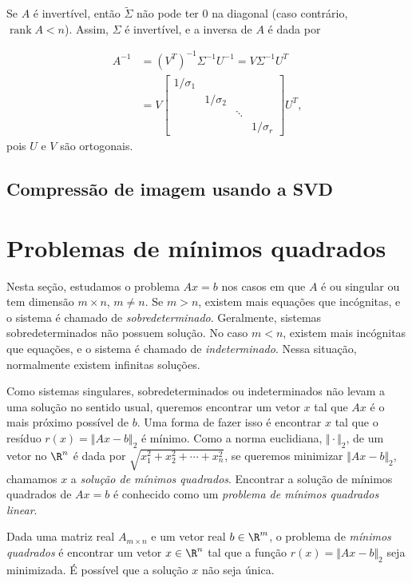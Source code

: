 \documentclass{article}
\DeclareMathOperator{\rank}{rank}
\begin{document}
Se \(A\) é invertível, então \(\tilde{\Sigma}\) não pode ter \(0\) na diagonal (caso contrário, \(\rank A < n\)). Assim, \(\Sigma\) é invertível, e a inversa de \(A\) é dada por

\begin{align}
    A^{-1} &= (V^T)^{-1} \Sigma^{-1} U^{-1} = V \Sigma^{-1} U^T \\
    &= V \begin{bmatrix}
        1/\sigma_1 & & & \\
        & 1/\sigma_2 & & \\
        & & \ddots & \\
        & & & 1/\sigma_r
    \end{bmatrix} U^T,
\end{align} pois \(U\) e \(V\) são ortogonais.

\subsection{Compressão de imagem usando a SVD}

\section{Problemas de mínimos quadrados}

Nesta seção, estudamos o problema \(Ax=b\) nos casos em que \(A\) é ou singular ou tem dimensão \(m \times n\), \(m \neq n\). Se \(m > n\), existem mais equações que incógnitas, e o sistema é chamado de \emph{sobredeterminado}. Geralmente, sistemas sobredeterminados não possuem solução. No caso \(m < n\), existem mais incógnitas que equações, e o sistema é chamado de \emph{indeterminado}. Nessa situação, normalmente existem infinitas soluções.

Como sistemas singulares, sobredeterminados ou indeterminados não levam a uma solução no sentido usual, queremos encontrar um vetor \(x\) tal que \(Ax\) é o mais próximo possível de \(b\). Uma forma de fazer isso é encontrar \(x\) tal que o resíduo \(r(x) = \Vert Ax - b \Vert_2\) é mínimo. Como a norma euclidiana, \(\Vert \cdot \Vert_2\), de um vetor no \(\R^n\) é dada por \(\sqrt{x_1^2 + x_2^2 + \cdots + x_n^2}\), se queremos minimizar \(\Vert Ax - b \Vert_2\), chamamos \(x\) a \emph{solução de mínimos quadrados}. Encontrar a solução de mínimos quadrados de \(Ax=b\) é conhecido como um \emph{problema de mínimos quadrados linear}.

\begin{defn}
    Dada uma matriz real \(A_{m \times n}\) e um vetor real \(b \in \R^m\), o problema de \emph{mínimos quadrados} é encontrar um vetor \(x \in \R^n\) tal que a função \(r(x) = \Vert Ax - b \Vert_2\) seja minimizada. É possível que a solução \(x\) não seja única.
\end{defn}
\end{document}

